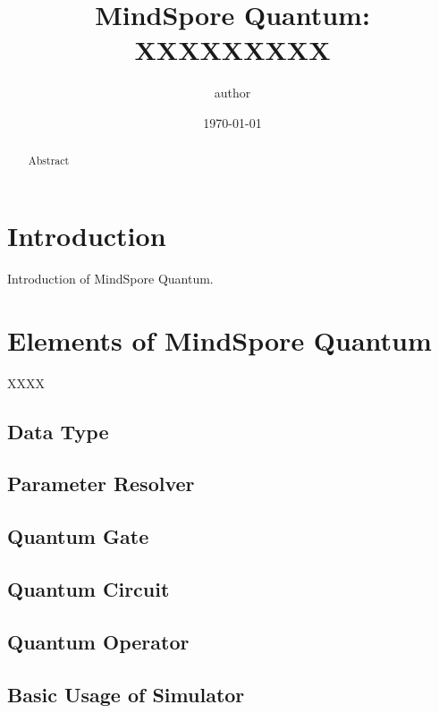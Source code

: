 \documentclass[pra,twocolumn,superscriptaddress,floatfix,nofootinbib,amsmath,amssymb]{revtex4-1}
\begin{document}
\title{MindSpore Quantum: XXXXXXXXX
}



\author{author}


\date{\today}



\begin{abstract}
Abstract
\end{abstract}
\maketitle
\tableofcontents

\section{Introduction}
Introduction of MindSpore Quantum.

\section{Elements of MindSpore Quantum}
XXXX
\subsection{Data Type}


\subsection{Parameter Resolver}


\subsection{Quantum Gate}


\subsection{Quantum Circuit}


\subsection{Quantum Operator}


\subsection{Basic Usage of Simulator}

\end{document}
